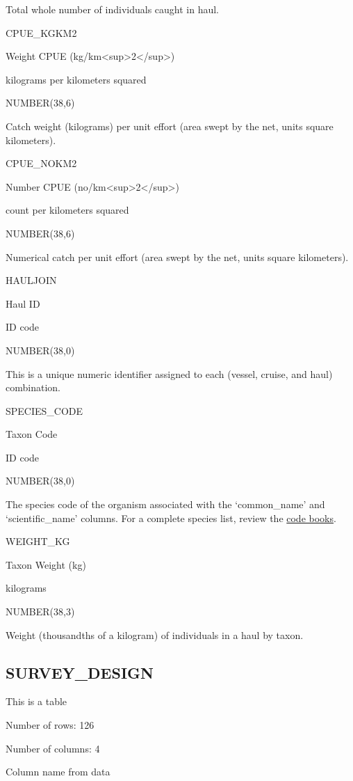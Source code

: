 \documentclass[
  letterpaper,
  oneside,
  open=any]{scrbook}
\begin{document}
Total whole number of individuals caught in haul.

CPUE\_KGKM2

Weight CPUE (kg/km\textless sup\textgreater2\textless/sup\textgreater)

kilograms per kilometers squared

NUMBER(38,6)

Catch weight (kilograms) per unit effort (area swept by the net, units
square kilometers).

CPUE\_NOKM2

Number CPUE (no/km\textless sup\textgreater2\textless/sup\textgreater)

count per kilometers squared

NUMBER(38,6)

Numerical catch per unit effort (area swept by the net, units square
kilometers).

HAULJOIN

Haul ID

ID code

NUMBER(38,0)

This is a unique numeric identifier assigned to each (vessel, cruise,
and haul) combination.

SPECIES\_CODE

Taxon Code

ID code

NUMBER(38,0)

The species code of the organism associated with the `common\_name' and
`scientific\_name' columns. For a complete species list, review the
\href{https://www.fisheries.noaa.gov/resource/document/groundfish-survey-species-code-manual-and-data-codes-manual}{code
books}.

WEIGHT\_KG

Taxon Weight (kg)

kilograms

NUMBER(38,3)

Weight (thousandths of a kilogram) of individuals in a haul by taxon.

\hypertarget{survey_design}{%
\subsection{SURVEY\_DESIGN}\label{survey_design}}

This is a table

Number of rows: 126

Number of columns: 4

Column name from data
\end{document}
